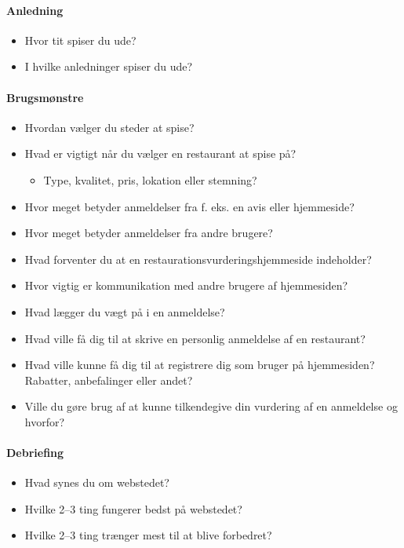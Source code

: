 \documentclass[a4paper, 12pt]{article}
\begin{document}
\paragraph{Anledning}
\begin{itemize}
\item Hvor tit spiser du ude?
\item I hvilke anledninger spiser du ude?
\end{itemize}

\paragraph{Brugsmønstre}
\begin{itemize}
\item Hvordan vælger du steder at spise?
\item Hvad er vigtigt når du vælger en restaurant at spise på?
  \begin{itemize}
  \item Type, kvalitet, pris, lokation eller stemning?
  \end{itemize}
\item Hvor meget betyder anmeldelser fra f. eks. en avis eller hjemmeside?
\item Hvor meget betyder anmeldelser fra andre brugere?
\item Hvad forventer du at en restaurationsvurderingshjemmeside indeholder?
\item Hvor vigtig er kommunikation med andre brugere af hjemmesiden?
\item Hvad lægger du vægt på i en anmeldelse?
\item Hvad ville få dig til at skrive en personlig anmeldelse af en restaurant?
\item Hvad ville kunne få dig til at registrere dig som bruger på hjemmesiden?
Rabatter, anbefalinger eller andet?
\item Ville du gøre brug af at kunne tilkendegive din vurdering af en anmeldelse
og hvorfor?
\end{itemize}

\paragraph{Debriefing}
\begin{itemize}
\item Hvad synes du om webstedet?
\item Hvilke 2--3 ting fungerer bedst på webstedet?
\item Hvilke 2--3 ting trænger mest til at blive forbedret?
\end{itemize}
\end{document}
